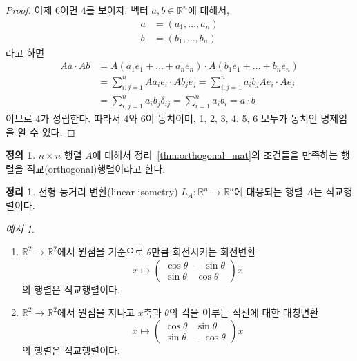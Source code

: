 \documentclass[unfonts,oneside,a4paper]{oblivoir}
\theoremstyle{definition}
\newtheorem{definition}{정의}[section]
\theoremstyle{theorem}
\newtheorem{theorem}{정리}[section]
\theoremstyle{theorem}
\theoremstyle{remark}
\theoremstyle{remark}
\theoremstyle{remark}
\newtheorem*{example}{예시}
\theoremstyle{remark}
\renewcommand{\vec}[1]{\bm{\mathit{#1}}}
\begin{document}
\begin{proof}
    이제 6이면 4를 보이자.
    벡터 $\vec a, \vec b \in \mathbb R^n$에 대해서,
    \begin{align*}
        \vec a &= (a_1, \dots, a_n)\\
        \vec b &= (b_1, \dots, b_n)
    \end{align*}
    라고 하면
    \begin{align*}
        A \vec a \cdot A \vec b &= A(a_1 \vec e_1 + \dots + a_n \vec e_n) \cdot A (b_1 \vec e_1 + \dots + b_n \vec e_n)\\
                                &= \sum_{i, j = 1}^n A a_i \vec e_i \cdot A b_j \vec e_j = \sum_{i, j = 1}^n a_i b_j A \vec e_i \cdot A \vec e_j\\
                                &= \sum_{i, j = 1}^n a_i b_j \delta_{ij} = \sum_{i = 1}^n a_i b_i = \vec a \cdot \vec b
    \end{align*}
    이므로 4가 성립한다.
    따라서 4와 6이 동치이며, 1, 2, 3, 4, 5, 6 모두가 동치인 명제임을 알 수 있다.
\end{proof}

\begin{definition} \label{def:orthogonal_mat}
    $n \times n$ 행렬 $A$에 대해서 정리~\ref{thm:orthogonal_mat}의 조건들을 만족하는 행렬을 직교(orthogonal)행렬이라고 한다.
\end{definition}

\begin{theorem}
    선형 등거리 변환(linear isometry) $L_A: \mathbb R^n \rightarrow \mathbb R^n$에 대응되는 행렬 $A$는 직교행렬이다.
\end{theorem}

\begin{example}
    \leavevmode
    \begin{enumerate}
        \item $\mathbb R^2 \rightarrow \mathbb R^2$에서 원점을 기준으로 $\theta$만큼 회전시키는 회전변환 
            \begin{equation*}
                \vec x \mapsto \begin{pmatrix}\cos \theta & -\sin \theta \\ \sin \theta & \cos \theta\end{pmatrix} \vec x
            \end{equation*}
        의 행렬은 직교행렬이다.
        \item $\mathbb R^2 \rightarrow \mathbb R^2$에서 원점을 지나고 $x$축과 $\theta$의 각을 이루는 직선에 대한 대칭변환 
            \begin{equation*}
                \vec x \mapsto \begin{pmatrix}\cos \theta & \sin \theta \\ \sin \theta & -\cos \theta\end{pmatrix} \vec x
            \end{equation*}
        의 행렬은 직교행렬이다.
    \end{enumerate}
\end{example}
\end{document}
